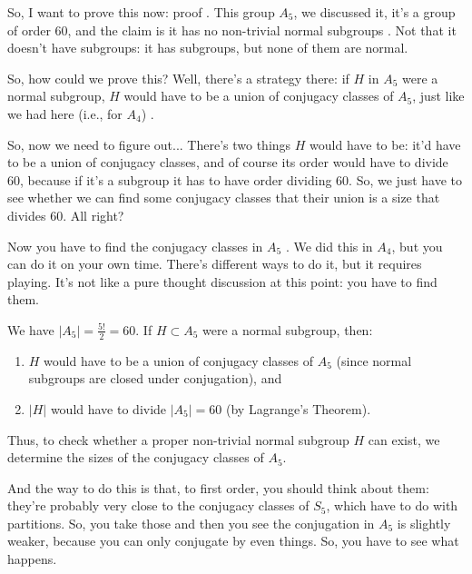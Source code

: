 \begin{proofWrapper}

\begin{speech}[00:22:42 - 00:24:15]
So, I want to prove this now: proof . This group $A_5$, we discussed it, it's a group of order $60$, and the claim is it has no non-trivial normal subgroups . Not that it doesn't have subgroups: it has subgroups, but none of them are normal.

So, how could we prove this? Well, there's a strategy there: if $H$ in $A_5$ were a normal subgroup, $H$ would have to be a union of conjugacy classes of $A_5$, just like we had here (i.e., for $A_4$) .

So, now we need to figure out... There's two things $H$ would have to be: it'd have to be a union of conjugacy classes, and of course its order would have to divide $60$, because if it's a subgroup it has to have order dividing $60$. So, we just have to see whether we can find some conjugacy classes that their union is a size that divides $60$. All right?

Now you have to find the conjugacy classes in $A_5$ . We did this in $A_4$, but you can do it on your own time. There's different ways to do it, but it requires playing. It's not like a pure thought discussion at this point: you have to find them.
\end{speech}

\begin{content}
We have $|A_5| = \frac{5!}{2} = 60$. If $H \subset A_5$ were a normal subgroup, then:
\begin{enumerate}[label=\textbf{(\arabic*)}]
    \item $H$ would have to be a union of conjugacy classes of $A_5$ (since normal subgroups are closed under conjugation), and
    \item $|H|$ would have to divide $|A_5| = 60$ (by Lagrange's Theorem).
\end{enumerate}
Thus, to check whether a proper non-trivial normal subgroup $H$ can exist, we determine the sizes of the conjugacy classes of $A_5$.
\end{content}

\begin{speech}[00:24:15 - 00:25:12]
And the way to do this is that, to first order, you should think about them: they're probably very close to the conjugacy classes of $S_5$, which have to do with partitions. So, you take those and then you see the conjugation in $A_5$ is slightly weaker, because you can only conjugate by even things. So, you have to see what happens.


\end{speech}
\end{proofWrapper}
